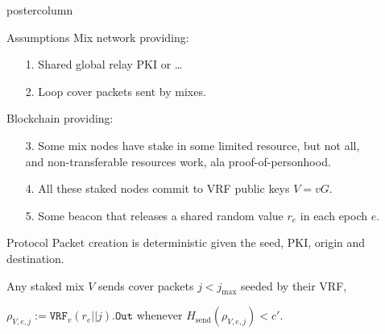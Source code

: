 \documentclass{beamer}
\newlength{\columnheight}
\begin{document}
\begin{frame}
\begin{columns}
    \begin{column}{.49\textwidth}
      \begin{beamercolorbox}[center,wd=\textwidth]{postercolumn}
        \begin{minipage}[T]{.95\textwidth} %
          \parbox[t][\columnheight]{\textwidth}{ %

            \begin{block}{Assumptions}
                Mix network providing:
                \begin{enumerate}
                \item[1.] Shared global relay PKI or \dots \\ \bigskip 
                \item[2.] Loop cover packets sent by mixes.
                \end{enumerate}
                \bigskip
                Blockchain providing:
                \begin{enumerate}
                \item[3.] Some mix nodes have stake in some limited resource, but not all, \\ and
              non-transferable resources work, ala proof-of-personhood. \\ \bigskip
                \item[4.] All these staked nodes commit to VRF public keys $V = v G$. \\ \bigskip
                \item[5.] Some beacon that releases a shared random value $r_e$ in each epoch $e$.
                \end{enumerate}
            \end{block}
            \vfill
            \begin{block}{Protocol}
                Packet creation is deterministic given the seed, PKI, origin and destination. \\ \bigskip \bigskip

                Any staked mix $V$ sends cover packets $j < j_{\max}$ seeded by their VRF,
                \begin{center}
                $\rho_{V,e,j} := \mathtt{VRF}_v(r_e || j).\mathtt{Out}$
                \quad whenever \quad 
                $H_{\mathrm{send}}(\rho_{V,e,j}) < c'$. %
                \end{center}


\end{block}}
\end{minipage}
\end{beamercolorbox}
\end{column}
\end{columns}
\end{frame}
\end{document}
